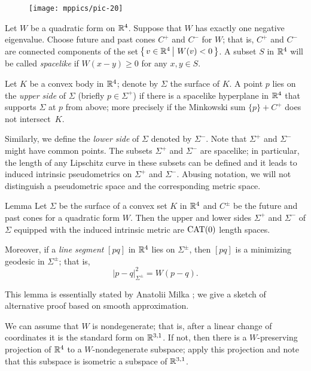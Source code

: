\documentclass{article}
\begin{document}
\begin{wrapfigure}{r}{55mm}
\vskip-4mm
\centering
\texttt{[image: mppics/pic-20]}
\end{wrapfigure}

Let $W$ be a quadratic form on $\mathbb{R}^4$.
Suppose that  $W$ has exactly one negative eigenvalue.
Choose future and past cones $C^+$ and $C^-$ for $W$;
that is, $C^+$ and $C^-$ are connected components of the set
$\set{v\in\RR^4}{W(v)< 0}$.
A subset $S$ in $\mathbb{R}^4$ will be called \emph{spacelike} if $W(x-y)\ge 0$ for any $x,y\in S$.

Let $K$ be a convex body in $\mathbb{R}^4$;
denote by $\Sigma$ the surface of $K$. 
A point $p$ lies on the \emph{upper side} of $\Sigma$ (briefly $p\in\Sigma^+$) if there is a spacelike hyperplane in $\mathbb{R}^4$ that supports $\Sigma$ at $p$ from above;
more precisely if the Minkowski sum $\{p\}+C^+$ does not intersect~$K$.

Similarly, we define the \emph{lower side} of $\Sigma$ denoted by $\Sigma^-$.
Note that $\Sigma^+$ and $\Sigma^-$ might have common points.
The subsets $\Sigma^+$ and $\Sigma^-$ are spacelike;
in particular, the length of any Lipschitz curve in these subsets can be defined and it leads to induced intrinsic pseudometrics on $\Sigma^+$ and $\Sigma^-$.
Abusing notation, we will not distinguish a pseudometric space and the corresponding metric space. 

\begin{thm}{Lemma}\label{lem:sides}
Let $\Sigma$ be the surface of a convex set $K$ in $\mathbb{R}^4$ and $C^\pm$ be the future and past cones for a quadratic form $W$.
Then the upper and lower sides $\Sigma^+$ and $\Sigma^-$ of $\Sigma$ equipped with the induced intrinsic metric are $\mathrm{CAT}(0)$ length spaces.

Moreover, if a \emph{line segment} $[pq]$ in $\mathbb{R}^4$ 
lies on $\Sigma^\pm$, then $[pq]$ is a minimizing geodesic in $\Sigma^\pm$; that is,
\[|p-q|_{\Sigma^\pm}^2=W(p-q).\]

\end{thm}

This lemma is essentially stated by Anatolii Milka \cite[Theorem~4]{milka}; we give a sketch of alternative proof based on smooth approximation.

We can assume that $W$ is nondegenerate; that is, after a linear change of coordinates it is the standard form on $\mathbb{R}^{3,1}$.
If not, then there is a $W$-preserving projection of $\mathbb{R}^4$ to a $W$-nondegenerate subspace; apply this projection and note that this subspace is isometric a subspace of $\mathbb{R}^{3,1}$.
\end{document}
